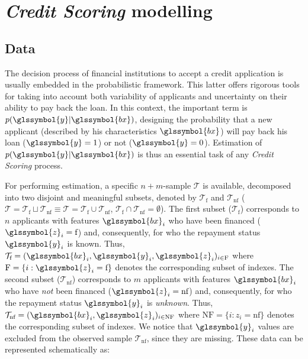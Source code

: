 \section{\textit{Credit Scoring} modelling} \label{sec:criteres}

\subsection{Data} 

The decision process of financial institutions to accept a credit application is usually embedded in the  probabilistic framework. This latter offers rigorous tools for taking into account both variability of applicants and uncertainty on their ability to pay back the loan. In this context, the important term is $p(\glssymbol{y}|\glssymbol{bx})$, designing the probability that a new applicant (described by his characteristics $\glssymbol{bx}$) will pay back his loan ($\glssymbol{y}=1$) or not ($\glssymbol{y}=0$). Estimation of $p(\glssymbol{y}|\glssymbol{bx})$ is thus an essential task of any \textit{Credit Scoring} process.

For performing estimation, a specific $n + m$-sample $\mathcal{T}$ is available, decomposed into two disjoint and meaningful subsets, denoted by $\mathcal{T}_{\text{f}}$ and $\mathcal{T}_{\text{nf}}$ ($\mathcal{T}=\mathcal{T}_{\text{f}} \sqcup \mathcal{T}_{\text{nf}} \equiv \mathcal{T}=\mathcal{T}_{\text{f}} \cup \mathcal{T}_{\text{nf}}$, $\mathcal{T}_{\text{f}}\cap \mathcal{T}_{\text{nf}}=\emptyset$). The first subset ($\mathcal{T}_{\text{f}}$) corresponds to $n$ applicants with features $\glssymbol{bx}_i$ who have been financed ($\glssymbol{z}_i={\text{f}}$) and, consequently, for who the repayment status $\glssymbol{y}_i$ is known. Thus, $\mathcal{T}_{\text{f}}=(\glssymbol{bx}_i,\glssymbol{y}_i,\glssymbol{z}_i)_{i\in \text{F}}$ where $\text{F}=\{i:\glssymbol{z}_i={\text{f}}\}$ denotes the corresponding subset of indexes. The second subset ($\mathcal{T}_{\text{nf}}$) corresponds to $m$ applicants with features $\glssymbol{bx}_i$ who have {\it not} been financed ($\glssymbol{z}_i={\text{nf}}$) and, consequently, for who the repayment status $\glssymbol{y}_i$ is {\it unknown}. Thus, $\mathcal{T}_{\text{nf}}=(\glssymbol{bx}_i,\glssymbol{z}_i)_{i\in \text{NF}}$ where $\text{NF}=\{i:z_i={\text{nf}}\}$ denotes the corresponding subset of indexes. We notice that $\glssymbol{y}_i$ values are excluded from the observed sample $\mathcal{T}_{\text{nf}}$, since they are missing. These data can be represented schematically as:

